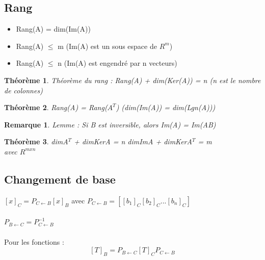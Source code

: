 \documentclass{article}
\newtheorem{remark}{Remarque}[section]
\newtheorem{theorem}{Théorème}[section]
\begin{document}
\subsection{Rang}
\begin{itemize}
    \item Rang(A) = dim(Im(A))
    \item Rang(A) $\leq$ m \qquad (Im(A) est un sous espace de $R^m$)
    \item Rang(A) $\leq$ n \qquad (Im(A) est engendré par n vecteurs)
\end{itemize}
\begin{theorem}
    Théorème du rang : Rang(A) + dim(Ker(A)) = n \qquad (n est le nombre de colonnes)
\end{theorem}
\begin{theorem}
    Rang(A) = Rang($A^T$) \qquad (dim(Im(A)) = dim(Lgn(A)))
\end{theorem}
\begin{remark}
    Lemme : Si B est inversible, alors Im(A) = Im(AB)
\end{remark}
\begin{theorem}
    dimA$^T$ + dimKerA = n 
    dimImA + dimKerA$^T$ = m\\avec $R^{m x n}$
\end{theorem}
\subsection{Changement de base} 
$[x]_C = P_{C \leftarrow B}[x]_B $ avec $P_{C \leftarrow B} = [[b_1]_C [b_2]_C ... [b_n]_C] $ \\\\
$P_{B \leftarrow C} = P_{C \leftarrow B}^{-1}$ \\\\
Pour les fonctions :
\[ [T]_B = P_{B \leftarrow C}[T]_CP_{C \leftarrow B}\]
\end{document}

